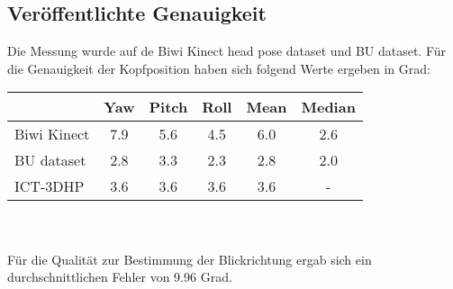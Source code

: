 \subsection{Veröffentlichte Genauigkeit}
Die Messung wurde auf de Biwi Kinect head pose dataset und BU dataset. Für die Genauigkeit der Kopfposition haben sich folgend Werte ergeben in Grad:\\
\begin{tabular}{|l|c|c|c||c|c|}
	\hline
	&Yaw&Pitch&Roll&Mean&Median\\\hline
	Biwi Kinect \cite{BIWI_database}&7.9&5.6&4.5&6.0&2.6\\\hline
	BU dataset \cite{BU_database}&2.8&3.3&2.3&2.8&2.0\\\hline
	ICT-3DHP \cite{ICT_database} &3.6&3.6&3.6&3.6&-\\\hline
\end{tabular}\\\\
Für die Qualität zur Bestimmung der Blickrichtung ergab sich ein durchschnittlichen Fehler von 9.96 Grad.